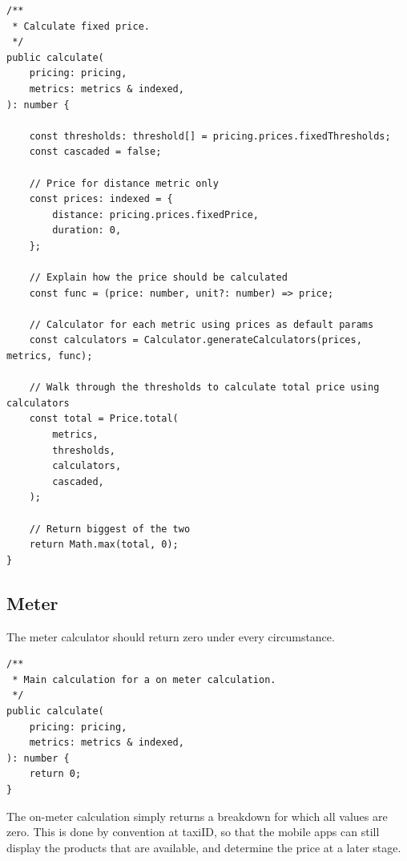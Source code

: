 \begin{minipage}{\linewidth}
\begin{lstlisting}[caption={Fixed calculation.}, label={lst:fixed-calculation}]
/**
 * Calculate fixed price.
 */
public calculate(
	pricing: pricing,
	metrics: metrics & indexed,
): number {

	const thresholds: threshold[] = pricing.prices.fixedThresholds;
	const cascaded = false;

	// Price for distance metric only
	const prices: indexed = {
		distance: pricing.prices.fixedPrice,
		duration: 0,
	};

	// Explain how the price should be calculated
	const func = (price: number, unit?: number) => price;

	// Calculator for each metric using prices as default params
	const calculators = Calculator.generateCalculators(prices, metrics, func);

	// Walk through the thresholds to calculate total price using calculators
	const total = Price.total(
		metrics,
		thresholds,
		calculators,
		cascaded,
	);

	// Return biggest of the two
	return Math.max(total, 0);
}
\end{lstlisting}
\end{minipage}

\subsection{Meter}
The meter calculator should return zero under every circumstance.

\begin{minipage}{\linewidth}
\begin{lstlisting}[caption={Meter calculation.}, label={lst:meter-calculation}]
/**
 * Main calculation for a on meter calculation.
 */
public calculate(
	pricing: pricing,
	metrics: metrics & indexed,
): number {
	return 0;
}
\end{lstlisting}
\end{minipage}

The on-meter calculation simply returns a breakdown for which all values are zero. This is done by convention at taxiID, so that the mobile apps can still display the products that are available, and determine the price at a later stage.

